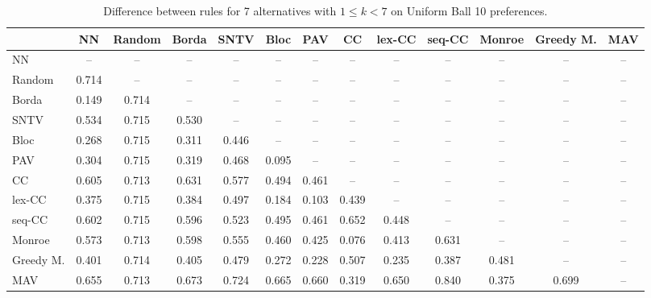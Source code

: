 
\begin{table*}[h!]
\centering
\begin{tabular}{lcccccccccccc}
\toprule
 & NN & Random & Borda & SNTV & Bloc & PAV & CC & lex-CC & seq-CC & Monroe & Greedy M. & MAV \\
\midrule
NN & -- & -- & -- & -- & -- & -- & -- & -- & -- & -- & -- & -- \\
Random & 0.714 & -- & -- & -- & -- & -- & -- & -- & -- & -- & -- & -- \\
Borda & 0.149 & 0.714 & -- & -- & -- & -- & -- & -- & -- & -- & -- & -- \\
SNTV & 0.534 & 0.715 & 0.530 & -- & -- & -- & -- & -- & -- & -- & -- & -- \\
Bloc & 0.268 & 0.715 & 0.311 & 0.446 & -- & -- & -- & -- & -- & -- & -- & -- \\
PAV & 0.304 & 0.715 & 0.319 & 0.468 & 0.095 & -- & -- & -- & -- & -- & -- & -- \\
CC & 0.605 & 0.713 & 0.631 & 0.577 & 0.494 & 0.461 & -- & -- & -- & -- & -- & -- \\
lex-CC & 0.375 & 0.715 & 0.384 & 0.497 & 0.184 & 0.103 & 0.439 & -- & -- & -- & -- & -- \\
seq-CC & 0.602 & 0.715 & 0.596 & 0.523 & 0.495 & 0.461 & 0.652 & 0.448 & -- & -- & -- & -- \\
Monroe & 0.573 & 0.713 & 0.598 & 0.555 & 0.460 & 0.425 & 0.076 & 0.413 & 0.631 & -- & -- & -- \\
Greedy M. & 0.401 & 0.714 & 0.405 & 0.479 & 0.272 & 0.228 & 0.507 & 0.235 & 0.387 & 0.481 & -- & -- \\
MAV & 0.655 & 0.713 & 0.673 & 0.724 & 0.665 & 0.660 & 0.319 & 0.650 & 0.840 & 0.375 & 0.699 & -- \\
\bottomrule
\end{tabular}

\caption{Difference between rules for 7 alternatives with $1 \leq k < 7$ on Uniform Ball 10 preferences.}
\end{table*}
